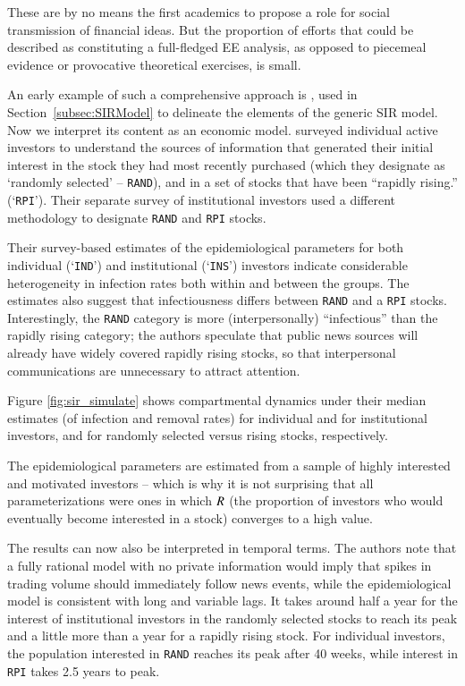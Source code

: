 These are by no means the first academics to propose a role for social transmission of financial ideas.  But the proportion of efforts that could be described as constituting a full-fledged EE analysis, as opposed to piecemeal evidence or provocative theoretical exercises, is small. %

An early example of such a comprehensive approach is  \cite{shiller1989survey}, used in Section~\ref{subsec:SIRModel} to delineate the elements of the generic SIR model.  Now we interpret its content as an economic model.  \cite{shiller1989survey} surveyed individual active investors to understand the sources of information that generated their initial interest in the stock they had most recently purchased (which they designate as `randomly selected' -- \texttt{RAND}), and in a set of stocks that have been ``rapidly rising.'' (`\texttt{RPI}').  Their separate survey of institutional investors used a different methodology to designate \texttt{RAND} and \texttt{RPI} stocks. %

Their survey-based estimates of the epidemiological parameters for both individual (`\texttt{IND}') and institutional (`\texttt{INS}') investors indicate considerable heterogeneity in infection rates both within and between the groups. The estimates also suggest that infectiousness differs between \texttt{RAND} and a \texttt{RPI} stocks. Interestingly, the \texttt{RAND} category is more (interpersonally) ``infectious'' than the rapidly rising category; the authors speculate that public news sources will already have widely covered rapidly rising stocks, so that interpersonal communications are unnecessary to attract attention.

Figure \ref{fig:sir_simulate} shows compartmental dynamics under their median estimates (of infection and removal rates) for individual and for institutional investors, and for randomly selected versus rising stocks, respectively.

The epidemiological parameters are estimated from a sample of highly interested and motivated investors -- which is why it is not surprising that all parameterizations were ones in which $\Recovered$ (the proportion of investors who would eventually become interested in a stock) converges to a high value.

The results can now also be interpreted in temporal terms.  The authors note that a fully rational model with no private information would imply that spikes in trading volume should immediately follow news events, while the epidemiological model is consistent with long and variable lags.  It takes around half a year for the interest of institutional investors in the randomly selected stocks to reach its peak and a little more than a year for a rapidly rising stock. For individual investors, the population interested in \texttt{RAND} reaches its peak after 40 weeks, while interest in \texttt{RPI} takes 2.5 years to peak.

